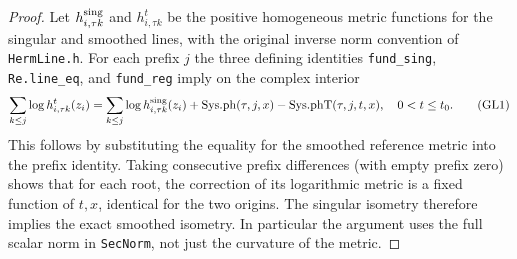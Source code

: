 \begin{proof}
Let \(h^{\rm sing}_{i,\tau k}\) and \(h^t_{i,\tau k}\)
be the positive homogeneous metric functions for the
singular and smoothed lines, with the original inverse
norm convention of \texttt{HermLine.h}.
For each prefix \(j\) the three defining identities
\texttt{fund\_sing}, \texttt{Re.line\_eq}, and
\texttt{fund\_reg} imply on the complex interior
\[
 \sum_{k\le j}\log h^t_{i,\tau k}(z_i)
  =\sum_{k\le j}\log h^{\rm sing}_{i,\tau k}(z_i)
      +\mathrm{Sys.ph}(\tau,j,x)
      -\mathrm{Sys.phT}(\tau,j,t,x),\quad 0<t\le t_0.       \tag{GL1}
\]
This follows by substituting the equality for the
smoothed reference metric into the prefix identity.
Taking consecutive prefix differences (with empty prefix
zero) shows that for each root, the correction of its
logarithmic metric is a fixed function of \(t,x\), identical
for the two origins. The singular isometry therefore
implies the exact smoothed isometry. In particular the
argument uses the full scalar norm in
\texttt{SecNorm}, not just the curvature of the metric.


\end{proof}
